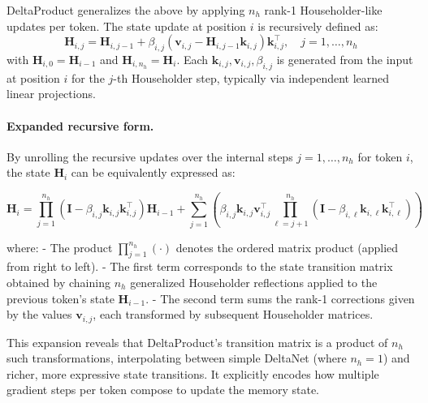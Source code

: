 \documentclass[10pt,a4paper]{article}
\begin{document}
DeltaProduct generalizes the above by applying $n_h$ rank-1 Householder-like updates per token. The state update at position $i$ is recursively defined as:
\begin{equation}
    \mathbf{H}_{i, j} = \mathbf{H}_{i, j-1} + \beta_{i, j} \left( \mathbf{v}_{i, j} - \mathbf{H}_{i, j-1} \mathbf{k}_{i, j} \right) \mathbf{k}_{i, j}^\top, \quad j=1,\ldots,n_h
    \label{eq:deltaproduct-recurrence}
\end{equation}
with $\mathbf{H}_{i, 0} = \mathbf{H}_{i-1}$ and $\mathbf{H}_{i, n_h} = \mathbf{H}_i$. Each $\mathbf{k}_{i, j}, \mathbf{v}_{i, j}, \beta_{i, j}$ is generated from the input at position $i$ for the $j$-th Householder step, typically via independent learned linear projections.


\paragraph{Expanded recursive form.}

By unrolling the recursive updates over the internal steps \(j = 1, \ldots, n_h\) for token \(i\), the state \(\mathbf{H}_i\) can be equivalently expressed as:

\begin{equation}
\mathbf{H}_i = \prod_{j=1}^{n_h} \left(\mathbf{I} - \beta_{i,j} \mathbf{k}_{i,j} \mathbf{k}_{i,j}^\top \right) \mathbf{H}_{i-1} 
+ \sum_{j=1}^{n_h} \left( \beta_{i,j} \mathbf{k}_{i,j} \mathbf{v}_{i,j}^\top \prod_{\ell = j+1}^{n_h} \left(\mathbf{I} - \beta_{i,\ell} \mathbf{k}_{i,\ell} \mathbf{k}_{i,\ell}^\top \right) \right)
\end{equation}

where:
- The product \(\prod_{j=1}^{n_h} (\cdot)\) denotes the ordered matrix product (applied from right to left).
- The first term corresponds to the state transition matrix obtained by chaining \(n_h\) generalized Householder reflections applied to the previous token’s state \(\mathbf{H}_{i-1}\).
- The second term sums the rank-1 corrections given by the values \(\mathbf{v}_{i,j}\), each transformed by subsequent Householder matrices.
  
This expansion reveals that DeltaProduct’s transition matrix is a product of \(n_h\) such transformations, interpolating between simple DeltaNet (where \(n_h=1\)) and richer, more expressive state transitions. It explicitly encodes how multiple gradient steps per token compose to update the memory state.
\end{document}
